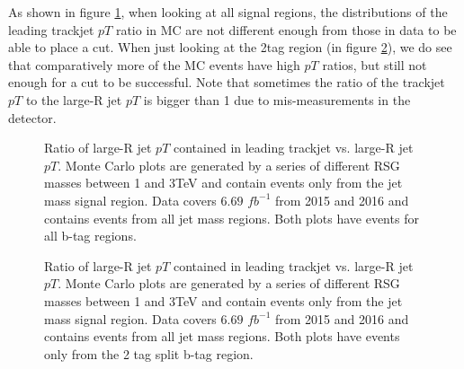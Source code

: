 As shown in figure \ref{fig:app-cut-ptratio-all}, when looking at all signal regions, the distributions of the leading trackjet $pT$ ratio in MC are not different enough from those in data to be able to place a cut. When just looking at the 2tag region (in figure \ref{fig:app-cut-ptratio-2tag}), we do see that comparatively more of the MC events have high $pT$ ratios, but still not enough for a cut to be successful. Note that sometimes the ratio of the trackjet $pT$ to the large-R jet $pT$ is bigger than 1 due to mis-measurements in the detector.

\begin{figure}[htbp!]
\begin{center}
\qquad
\caption{Ratio of large-R jet $pT$ contained in leading trackjet vs. large-R jet $pT$. Monte Carlo plots are generated by a series of different RSG masses between 1 and 3TeV and contain events only from the jet mass signal region. Data covers $6.69$ $fb^{-1}$ from 2015 and 2016 and contains events from all jet mass regions. Both plots have events for all b-tag regions.}
\label{fig:app-cut-ptratio-all}
\end{center}
\end{figure}

\begin{figure}[htbp!]
\begin{center}
\qquad
\caption{Ratio of large-R jet $pT$ contained in leading trackjet vs. large-R jet $pT$. Monte Carlo plots are generated by a series of different RSG masses between 1 and 3TeV and contain events only from the jet mass signal region. Data covers $6.69$ $fb^{-1}$ from 2015 and 2016 and contains events from all jet mass regions. Both plots have events only from the 2 tag split b-tag region.}
\label{fig:app-cut-ptratio-2tag}
\end{center}
\end{figure}








